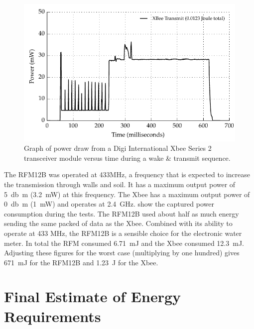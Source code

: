     \begin{figure}
      \centering
      \includegraphics{content/pt1/03-EnergyRequirements/graphics/Graph_XbeePower.pdf}
      \caption{\label{fig:Energy-consumed-XBee}Graph of power draw from a Digi International Xbee Series 2 transceiver module versus time during a wake \& transmit sequence.}
    \end{figure}

    The RFM12B was operated at 433MHz, a frequency that is expected to increase the transmission through walls and soil.
    It has a maximum output power of \SI{5}{\decibel m} (\SI{3.2}{\milli\watt}) at this frequency.
    The Xbee has a maximum output power of \SI{0}{\decibel m} (\SI{1}{\milli\watt}) and operates at \SI{2.4}{\giga\hertz}.
     show the captured power consumption during the tests.
    The RFM12B used about half as much energy sending the same packed of data as the Xbee.
    Combined with its ability to operate at 433 MHz, the RFM12B is a sensible choice for the electronic water meter.
    In total the RFM consumed \SI{6.71}{\milli\joule} and the Xbee consumed \SI{12.3}{\milli\joule}.
    Adjusting these figures for the worst case (multiplying by one hundred) gives \SI{671}{\milli\joule} for the RFM12B and \SI{1.23}{\joule} for the Xbee.

  \section{Final Estimate of Energy Requirements}

